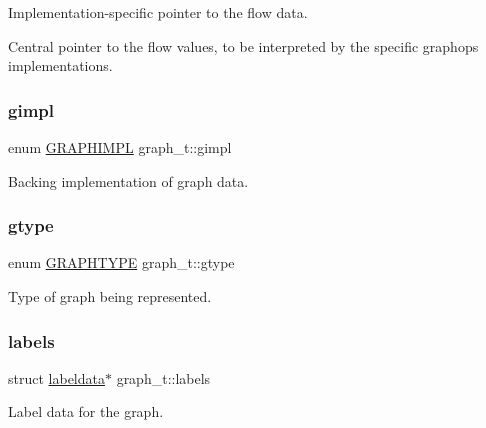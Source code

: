 Implementation-\/specific pointer to the flow data. 

Central pointer to the flow values, to be interpreted by the specific graphops implementations. \mbox{\label{structgraph__t_a220aff118ba6d13c927486099988c03d}} 
\subsubsection{\texorpdfstring{gimpl}{gimpl}}
{\footnotesize\ttfamily enum \hyperlink{graphdata_8h_ad7f3a639f97221897a0429715dccefe6}{G\+R\+A\+P\+H\+I\+M\+PL} graph\+\_\+t\+::gimpl}



Backing implementation of graph data. 

\mbox{\label{structgraph__t_a602be255ab0523e0a5fe28436a29159a}} 
\subsubsection{\texorpdfstring{gtype}{gtype}}
{\footnotesize\ttfamily enum \hyperlink{graphdata_8h_a384e88b524b782ff50439055cbc8a5c2}{G\+R\+A\+P\+H\+T\+Y\+PE} graph\+\_\+t\+::gtype}



Type of graph being represented. 

\mbox{\label{structgraph__t_a2ea51094b5b0a3b3035895948ded5b44}} 
\subsubsection{\texorpdfstring{labels}{labels}}
{\footnotesize\ttfamily struct \hyperlink{graphdata_8h_a625fc818ed28f282dba71f20cd31b848}{labeldata}$\ast$ graph\+\_\+t\+::labels}



Label data for the graph. 

\mbox{\label{structgraph__t_ab11b23897ec5b39d38c3f85581bd313e}} 
